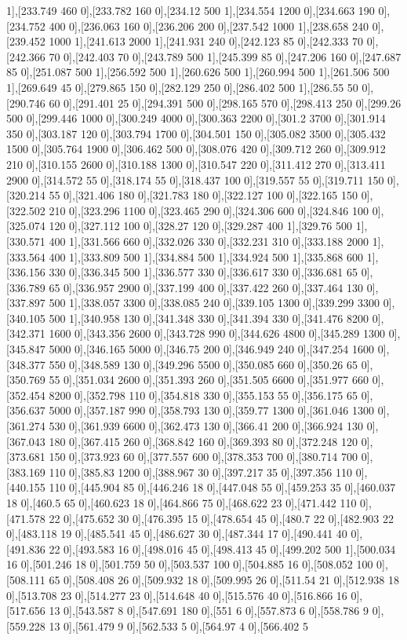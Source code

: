 {1],[233.749 460 0],[233.782 160 0],[234.12 500 1],[234.554 1200 0],[234.663 190 0],[234.752 400 0],[236.063 160 0],[236.206 200 0],[237.542 1000 1],[238.658 240 0],[239.452 1000 1],[241.613 2000 1],[241.931 240 0],[242.123 85 0],[242.333 70 0],[242.366 70 0],[242.403 70 0],[243.789 500 1],[245.399 85 0],[247.206 160 0],[247.687 85 0],[251.087 500 1],[256.592 500 1],[260.626 500 1],[260.994 500 1],[261.506 500 1],[269.649 45 0],[279.865 150 0],[282.129 250 0],[286.402 500 1],[286.55 50 0],[290.746 60 0],[291.401 25 0],[294.391 500 0],[298.165 570 0],[298.413 250 0],[299.26 500 0],[299.446 1000 0],[300.249 4000 0],[300.363 2200 0],[301.2 3700 0],[301.914 350 0],[303.187 120 0],[303.794 1700 0],[304.501 150 0],[305.082 3500 0],[305.432 1500 0],[305.764 1900 0],[306.462 500 0],[308.076 420 0],[309.712 260 0],[309.912 210 0],[310.155 2600 0],[310.188 1300 0],[310.547 220 0],[311.412 270 0],[313.411 2900 0],[314.572 55 0],[318.174 55 0],[318.437 100 0],[319.557 55 0],[319.711 150 0],[320.214 55 0],[321.406 180 0],[321.783 180 0],[322.127 100 0],[322.165 150 0],[322.502 210 0],[323.296 1100 0],[323.465 290 0],[324.306 600 0],[324.846 100 0],[325.074 120 0],[327.112 100 0],[328.27 120 0],[329.287 400 1],[329.76 500 1],[330.571 400 1],[331.566 660 0],[332.026 330 0],[332.231 310 0],[333.188 2000 1],[333.564 400 1],[333.809 500 1],[334.884 500 1],[334.924 500 1],[335.868 600 1],[336.156 330 0],[336.345 500 1],[336.577 330 0],[336.617 330 0],[336.681 65 0],[336.789 65 0],[336.957 2900 0],[337.199 400 0],[337.422 260 0],[337.464 130 0],[337.897 500 1],[338.057 3300 0],[338.085 240 0],[339.105 1300 0],[339.299 3300 0],[340.105 500 1],[340.958 130 0],[341.348 330 0],[341.394 330 0],[341.476 8200 0],[342.371 1600 0],[343.356 2600 0],[343.728 990 0],[344.626 4800 0],[345.289 1300 0],[345.847 5000 0],[346.165 5000 0],[346.75 200 0],[346.949 240 0],[347.254 1600 0],[348.377 550 0],[348.589 130 0],[349.296 5500 0],[350.085 660 0],[350.26 65 0],[350.769 55 0],[351.034 2600 0],[351.393 260 0],[351.505 6600 0],[351.977 660 0],[352.454 8200 0],[352.798 110 0],[354.818 330 0],[355.153 55 0],[356.175 65 0],[356.637 5000 0],[357.187 990 0],[358.793 130 0],[359.77 1300 0],[361.046 1300 0],[361.274 530 0],[361.939 6600 0],[362.473 130 0],[366.41 200 0],[366.924 130 0],[367.043 180 0],[367.415 260 0],[368.842 160 0],[369.393 80 0],[372.248 120 0],[373.681 150 0],[373.923 60 0],[377.557 600 0],[378.353 700 0],[380.714 700 0],[383.169 110 0],[385.83 1200 0],[388.967 30 0],[397.217 35 0],[397.356 110 0],[440.155 110 0],[445.904 85 0],[446.246 18 0],[447.048 55 0],[459.253 35 0],[460.037 18 0],[460.5 65 0],[460.623 18 0],[464.866 75 0],[468.622 23 0],[471.442 110 0],[471.578 22 0],[475.652 30 0],[476.395 15 0],[478.654 45 0],[480.7 22 0],[482.903 22 0],[483.118 19 0],[485.541 45 0],[486.627 30 0],[487.344 17 0],[490.441 40 0],[491.836 22 0],[493.583 16 0],[498.016 45 0],[498.413 45 0],[499.202 500 1],[500.034 16 0],[501.246 18 0],[501.759 50 0],[503.537 100 0],[504.885 16 0],[508.052 100 0],[508.111 65 0],[508.408 26 0],[509.932 18 0],[509.995 26 0],[511.54 21 0],[512.938 18 0],[513.708 23 0],[514.277 23 0],[514.648 40 0],[515.576 40 0],[516.866 16 0],[517.656 13 0],[543.587 8 0],[547.691 180 0],[551 6 0],[557.873 6 0],[558.786 9 0],[559.228 13 0],[561.479 9 0],[562.533 5 0],[564.97 4 0],[566.402 5 }
